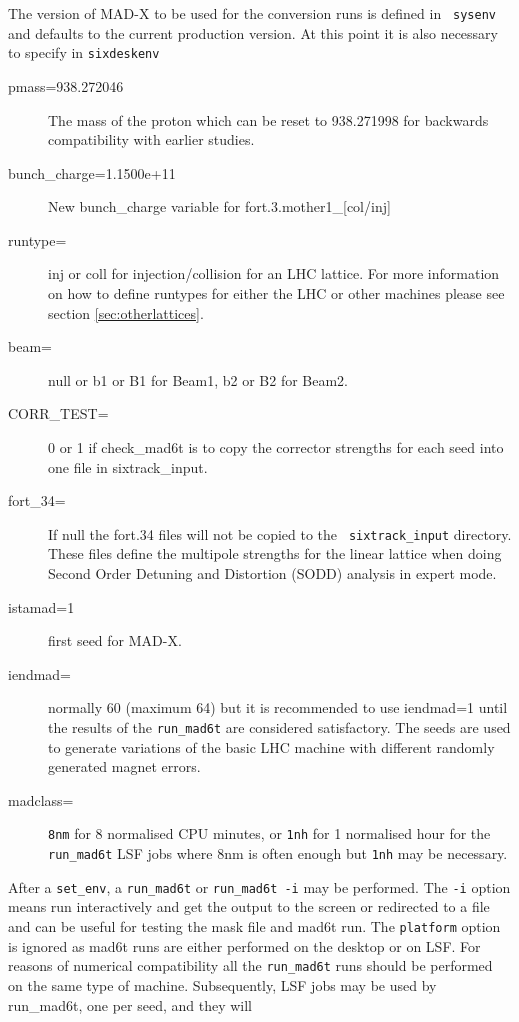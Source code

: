 \documentclass{cernatsnote}
\begin{document}
The version of MAD-X to be used for the conversion runs is defined in {\tt
sysenv} and defaults to the current production version.  At this point it is
also necessary to specify in \texttt{sixdeskenv}
\begin{description}
\item [pmass=938.272046] The mass of the proton \cite{NIST} which can be reset
  to 938.271998 for backwards compatibility with earlier studies.
\item [bunch\_charge=1.1500e+11] New bunch\_charge variable for
  fort.3.mother1\_[col/inj]
\item [runtype=] inj or coll for injection/collision for an LHC lattice.  For
  more information on how to define runtypes for either the LHC or other
  machines please see section \ref{sec:otherlattices}.
\item [beam=] null or b1 or B1 for Beam1, b2 or B2 for Beam2.
\item [CORR\_TEST=]0 or 1 if check\_mad6t is to copy the corrector strengths
for each seed into one file in sixtrack\_input.
\item [fort\_34=] If null the fort.34 files will not be copied to the {\tt
  sixtrack\_input} directory. These files define the multipole strengths for
  the linear lattice when doing Second Order Detuning and Distortion (SODD)
  analysis in expert mode.
\item [istamad=1] first seed for MAD-X.
\item [iendmad=] normally 60 (maximum 64) but it is recommended to use
  iendmad=1 until the results of the \texttt{run\_mad6t} are considered
  satisfactory.  The seeds are used to generate variations of the basic LHC
  machine with different randomly generated magnet errors.
\item[madclass=] \texttt{8nm} for 8 normalised CPU minutes, or \texttt{1nh} for 1
  normalised hour for the \texttt{run\_mad6t} LSF jobs where 8nm is often enough
  but \texttt{1nh} may be necessary.
\end{description}
After a \texttt{set\_env}, a \texttt{run\_mad6t} or \texttt{run\_mad6t -i} may be
performed.  The \texttt{-i} option means run interactively and get the output to
the screen or redirected to a file and can be useful for testing the mask file
and mad6t run.  The \texttt{platform} option is ignored as mad6t runs are either
performed on the desktop or on LSF. For reasons of numerical compatibility all
the \texttt{run\_mad6t} runs should be performed on the same type of machine.
Subsequently, LSF jobs may be used by {run\_mad6t}, one per seed, and they will
\end{document}
